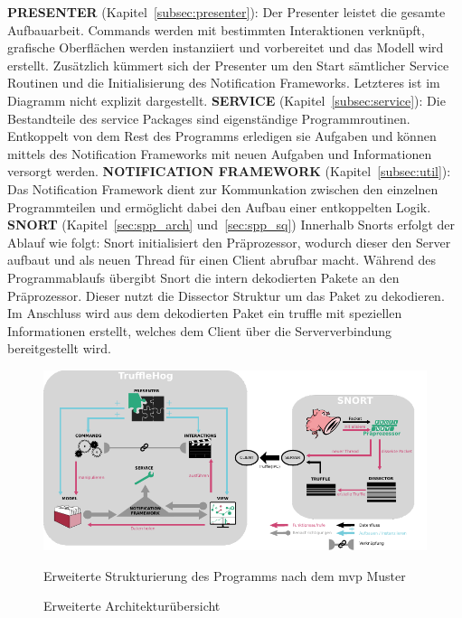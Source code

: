  \newline
\textbf{PRESENTER} (Kapitel~\ref{subsec:presenter}):\newline
Der Presenter leistet die gesamte Aufbauarbeit. Commands werden mit bestimmten Interaktionen verknüpft, grafische Oberflächen werden instanziiert und vorbereitet und das Modell wird erstellt. 
Zusätzlich kümmert sich der Presenter um den Start sämtlicher Service Routinen und die Initialisierung des Notification Frameworks. Letzteres ist im Diagramm nicht explizit dargestellt.\newline
 \newline
\textbf{SERVICE} (Kapitel~\ref{subsec:service}):\newline
Die Bestandteile des service Packages sind eigenständige Programmroutinen. Entkoppelt von dem Rest des Programms erledigen sie Aufgaben und können mittels des Notification Frameworks mit neuen Aufgaben und Informationen versorgt werden.\newline
 \newline
\textbf{NOTIFICATION FRAMEWORK} (Kapitel~\ref{subsec:util}):\newline
Das Notification Framework dient zur Kommunkation zwischen den einzelnen Programmteilen und ermöglicht dabei den Aufbau einer entkoppelten Logik.\newline
 \newline
\textbf{SNORT} (Kapitel~\ref{sec:spp_arch} und~\ref{sec:spp_sq})\newline
Innerhalb Snorts erfolgt der Ablauf wie folgt: Snort initialisiert den Präprozessor, wodurch dieser den Server aufbaut und als neuen Thread für einen Client abrufbar macht. Während des Programmablaufs übergibt Snort die intern dekodierten Pakete an den Präprozessor. Dieser nutzt die Dissector Struktur um das Paket zu dekodieren. Im Anschluss wird aus dem dekodierten Paket ein \gls{truffle} mit speziellen Informationen erstellt, welches dem Client über die Serververbindung bereitgestellt wird.\newline

\begin{figure}
  \centering
  \includegraphics[width=\textwidth]{../diagramimages/arch_diagram_mvp.pdf}
  \caption[Erweiterte Architekturübersicht]{Erweiterte Architekturübersicht}
  \medskip
  Erweiterte Strukturierung des Programms nach dem \gls{mvp} Muster
  \label{fig:arch_diagram}
\end{figure}
\FloatBarrier
